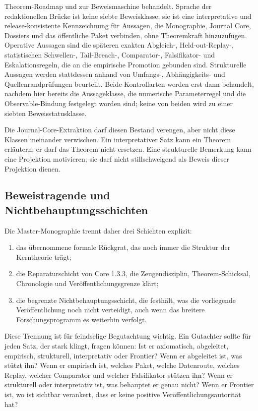 Theorem-Roadmap und zur Beweismaschine behandelt.
Sprache der redaktionellen Brücke ist keine siebte Beweisklasse; sie ist eine
interpretative und release-konsistente Kennzeichnung für Aussagen, die
Monographie, Journal Core, Dossiers und das öffentliche Paket verbinden, ohne
Theoremkraft hinzuzufügen.
Operative Aussagen sind die späteren exakten Abgleich-, Held-out-Replay-,
statistischen Schwellen-, Tail-Breach-, Comparator-, Falsifikator- und
Eskalationsregeln, die an die empirische Promotion gebunden sind.
Strukturelle Aussagen werden stattdessen anhand von Umfangs-, Abhängigkeits-
und Quellenrandprüfungen beurteilt. Beide Kontrollarten werden erst dann
behandelt, nachdem hier bereits die Aussageklasse, die numerische
Parameterregel und die Observable-Bindung festgelegt worden sind; keine von
beiden wird zu einer siebten Beweisstatusklasse.

Die Journal-Core-Extraktion darf diesen Bestand verengen, aber nicht diese
Klassen ineinander verwischen.
Ein interpretativer Satz kann ein Theorem erläutern; er darf das Theorem nicht
ersetzen.
Eine strukturelle Bemerkung kann eine Projektion motivieren; sie darf nicht
stillschweigend als Beweis dieser Projektion dienen.

\subsection{Beweistragende und Nichtbehauptungsschichten}

Die Master-Monographie trennt daher drei Schichten explizit:

\begin{enumerate}
\item das übernommene formale Rückgrat, das noch immer die Struktur der
      Kerntheorie trägt;
\item die Reparaturschicht von Core 1.3.3, die Zeugendisziplin, Theorem-Schicksal,
      Chronologie und Veröffentlichungsgrenze klärt;
\item die begrenzte Nichtbehauptungsschicht, die festhält, was die vorliegende
      Veröffentlichung noch nicht verteidigt, auch wenn das breitere
      Forschungsprogramm es weiterhin verfolgt.
\end{enumerate}

Diese Trennung ist für feindselige Begutachtung wichtig.
Ein Gutachter sollte für jeden Satz, der stark klingt, fragen können:
Ist er axiomatisch, abgeleitet, empirisch, strukturell, interpretativ oder
Frontier?
Wenn er abgeleitet ist, was stützt ihn?
Wenn er empirisch ist, welches Paket, welche Datenroute, welches Replay,
welcher Comparator und welcher Falsifikator stützen ihn?
Wenn er strukturell oder interpretativ ist, was behauptet er genau nicht?
Wenn er Frontier ist, wo ist sichtbar verankert, dass er keine positive
Veröffentlichungsautorität hat?

